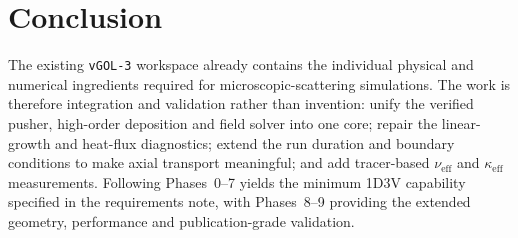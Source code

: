 \documentclass[11pt,a4paper]{article}
\begin{document}
\section{Conclusion}

The existing \texttt{vGOL-3} workspace already contains the individual physical and numerical
ingredients required for microscopic-scattering simulations. The work is therefore integration and
validation rather than invention: unify the verified pusher, high-order deposition and field solver
into one core; repair the linear-growth and heat-flux diagnostics; extend the run duration and
boundary conditions to make axial transport meaningful; and add tracer-based $\nu_{\mathrm{eff}}$
and $\kappa_{\mathrm{eff}}$ measurements. Following Phases~0--7 yields the minimum 1D3V capability
specified in the requirements note, with Phases~8--9 providing the extended geometry, performance
and publication-grade validation.
\end{document}
